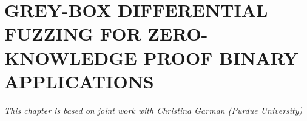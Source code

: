 \chapter{GREY-BOX DIFFERENTIAL FUZZING FOR ZERO-KNOWLEDGE PROOF BINARY APPLICATIONS}
\label{ch:greybox}

\textit{This chapter is based on joint work with Christina Garman (Purdue University)}










% 